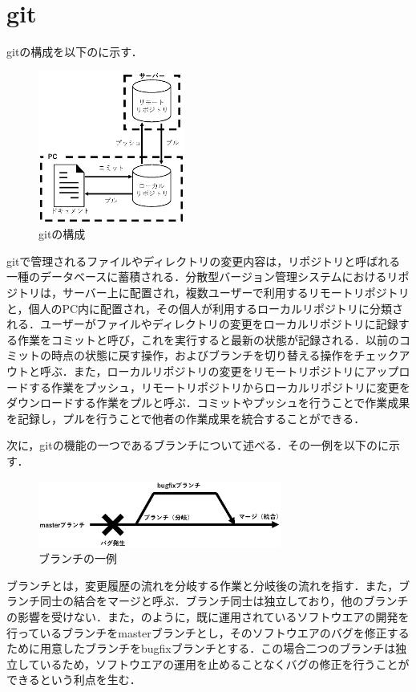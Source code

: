 \documentclass[a4paper,9pt,twocolumn]{jsarticle}
\begin{document}
\section{git}
gitの構成を以下のに示す．

\begin{figure}[h]
\centering
\includegraphics[height=50mm]{img/git.eps}
\caption{gitの構成}
\label{git}
\end{figure}

gitで管理されるファイルやディレクトリの変更内容は，リポジトリと呼ばれる一種のデータベースに蓄積される．分散型バージョン管理システムにおけるリポジトリは，サーバー上に配置され，複数ユーザーで利用するリモートリポジトリと，個人のPC内に配置され，その個人が利用するローカルリポジトリに分類される．ユーザーがファイルやディレクトリの変更をローカルリポジトリに記録する作業をコミットと呼び，これを実行すると最新の状態が記録される．以前のコミットの時点の状態に戻す操作，およびブランチを切り替える操作をチェックアウトと呼ぶ．また，ローカルリポジトリの変更をリモートリポジトリにアップロードする作業をプッシュ，リモートリポジトリからローカルリポジトリに変更をダウンロードする作業をプルと呼ぶ．コミットやプッシュを行うことで作業成果を記録し，プルを行うことで他者の作業成果を統合することができる．

次に，gitの機能の一つであるブランチについて述べる．その一例を以下のに示す．

\begin{figure}[h]
\centering
\includegraphics[width=80mm]{img/branch.eps}
\caption{ブランチの一例}
\label{branch}
\end{figure}

ブランチとは，変更履歴の流れを分岐する作業と分岐後の流れを指す．また，ブランチ同士の結合をマージと呼ぶ．ブランチ同士は独立しており，他のブランチの影響を受けない．また，のように，既に運用されているソフトウエアの開発を行っているブランチをmasterブランチとし，そのソフトウエアのバグを修正するために用意したブランチをbugfixブランチとする．この場合二つのブランチは独立しているため，ソフトウエアの運用を止めることなくバグの修正を行うことができるという利点を生む．
\end{document}
